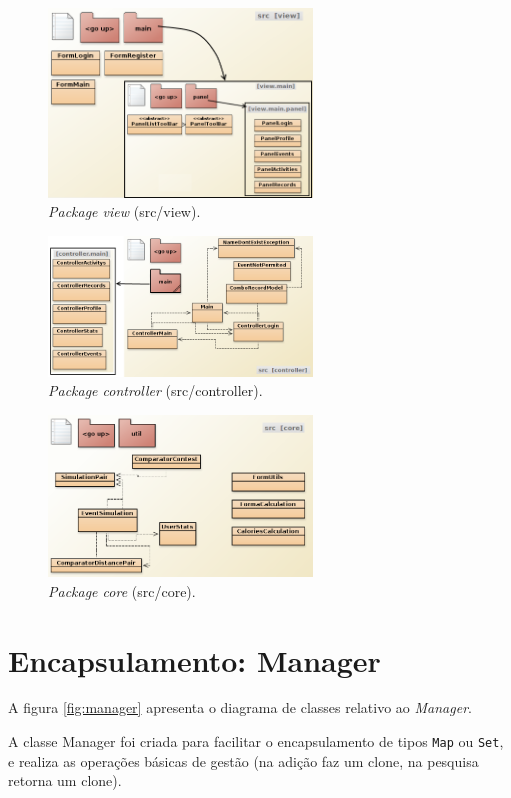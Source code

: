 \documentclass[a4paper,10pt]{report}
\begin{document}
\begin{figure}
\centering
\includegraphics[width=7cm]{view.png}
\caption{\emph{Package view} (src/view).}
\label{fig:view}
\end{figure}

\begin{figure}
\centering
\includegraphics[width=7cm]{controller.png}
\caption{\emph{Package controller} (src/controller).}
\label{fig:controller}
\end{figure}

\begin{figure}
\centering
\includegraphics[width=7cm]{core.png}
\caption{\emph{Package core} (src/core).}
\label{fig:core}
\end{figure}

\section{Encapsulamento: Manager}
\label{sec:manager}
A figura \ref{fig:manager} apresenta o diagrama de classes relativo ao \emph{Manager}.

A classe Manager foi criada para facilitar o encapsulamento de tipos \verb!Map! ou \verb!Set!, e realiza as operações básicas de gestão 
(na adição faz um clone, na pesquisa retorna um clone).
\end{document}
